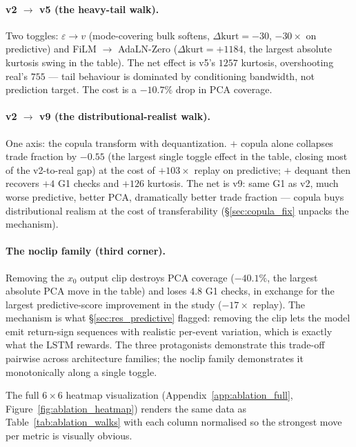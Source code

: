 \documentclass[journal]{IEEEtran}
\newcommand{\eps}{\varepsilon}
\theoremstyle{definition}   %
\begin{document}
\paragraph{v2 $\to$ v5 (the heavy-tail walk).}
Two toggles: $\eps \to v$ (mode-covering bulk softens,
$\Delta\text{kurt} = -30$, $-30\times$ on predictive) and
FiLM $\to$ AdaLN-Zero ($\Delta\text{kurt} = +1184$, the largest
absolute kurtosis swing in the table). The net effect is v5's
$1257$ kurtosis, overshooting real's $755$ --- tail behaviour is
dominated by conditioning bandwidth, not prediction target. The
cost is a $-10.7\%$ drop in PCA coverage.

\paragraph{v2 $\to$ v9 (the distributional-realist walk).}
One axis: the copula transform with dequantization. $+$ copula
alone collapses trade fraction by $-0.55$ (the largest single
toggle effect in the table, closing most of the v2-to-real gap)
at the cost of $+103\times$ replay on predictive; $+$ dequant
then recovers $+4$ G1 checks and $+126$ kurtosis. The net is v9:
same G1 as v2, much worse predictive, better PCA, dramatically
better trade fraction --- copula buys distributional realism at
the cost of transferability (\S\ref{sec:copula_fix} unpacks the
mechanism).

\paragraph{The noclip family (third corner).}
Removing the $x_0$ output clip destroys PCA coverage ($-40.1\%$,
the largest absolute PCA move in the table) and loses $4.8$ G1
checks, in exchange for the largest predictive-score improvement
in the study ($-17\times$ replay). The mechanism is what
\S\ref{sec:res_predictive} flagged: removing the clip lets the
model emit return-sign sequences with realistic per-event
variation, which is exactly what the LSTM rewards. The three
protagonists demonstrate this trade-off pairwise across architecture
families; the noclip family demonstrates it monotonically along
a single toggle.

The full $6 \times 6$ heatmap visualization
(Appendix~\ref{app:ablation_full}, Figure~\ref{fig:ablation_heatmap})
renders the same data as Table~\ref{tab:ablation_walks} with each
column normalised so the strongest move per metric is visually
obvious.
\end{document}
